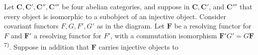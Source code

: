 
Let $\mathbf C,\mathbf C',\mathbf C'',\mathbf C'''$ be four abelian categories, and suppose in $\mathbf C,\mathbf C'$, and
$\mathbf C'''$ that every object is isomorphic to a subobject of an injective object.
Consider covariant functors $F,G,F',G'$ as in the diagram. Let $\mathbf F$ be
a resolving functor for $F$ and $\mathbf F'$ a resolving functor for $F'$,
with a commutation isomorphism
$\mathbf F'G'=G\mathbf F$\textsuperscript{7)}. Suppose in addition that $\mathbf F$ carries
injective objects to

